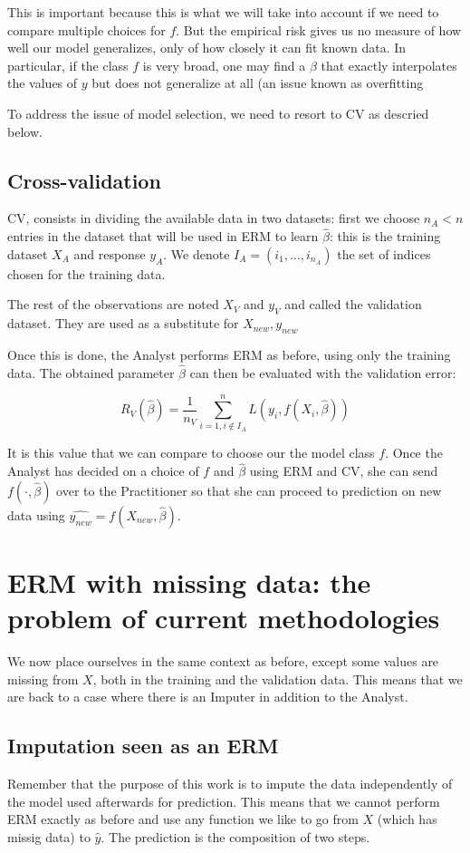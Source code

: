  This is important because this is what we will take into account if we need to compare multiple choices for $f$. But the empirical risk gives us no measure of how well our model generalizes, only of how closely it can fit known data. In particular, if the class $f$ is very broad, one may find a $\beta$ that exactly interpolates the values of $y$ but does not generalize at all (an issue known as overfitting \cite{overfitting}

To address the issue of model selection, we need to resort to CV as descried below.

		\subsection{Cross-validation}
CV, consists in dividing the available data in two datasets: first we choose $n_A < n$ entries in the dataset that will be used in ERM to learn $\hat{\beta}$: this is the training dataset $X_A$ and response $y_A$. We denote $I_A = (i_1, \ldots, i_{n_A})$ the set of indices chosen for the training data.

The rest of the observations are noted $X_V$ and $y_V$ and called the validation dataset. They are used as a substitute for $X_{new},y_{new}$

Once this is done, the Analyst performs ERM as before, using only the training data. The obtained parameter $\hat{\beta}$ can then be evaluated with the validation error:

$$ R_{V}(\hat{\beta}) = \frac{1}{n_V} \sum\limits_{i=1, i \notin I_A}^n L(y_i, f(X_i, \hat{\beta}))$$

It is this value that we can compare to choose our the model class $f$. Once the Analyst has decided on a choice of $f$ and $\hat{\beta}$ using ERM and CV, she can send $f(\cdot, \hat{\beta})$ over to the Practitioner so that she can proceed to prediction on new data using $\hat{y_{new}} = f(X_{new}, \hat{\beta})$.

	\section{ERM with missing data: the problem of current methodologies}
	\label{ERM.imp}
We now place ourselves in the same context as before, except some values are missing from $X$, both in the training and the validation data. This means that we are back to a case where there is an Imputer in addition to the Analyst.
		\subsection{Imputation seen as an ERM}
Remember that the purpose of this work is to impute the data independently of the model used afterwards for prediction. This means that we cannot perform ERM exactly as before and use any function we like to go from $X$ (which has missig data) to $\hat{y}$. The prediction is the composition of two steps.
